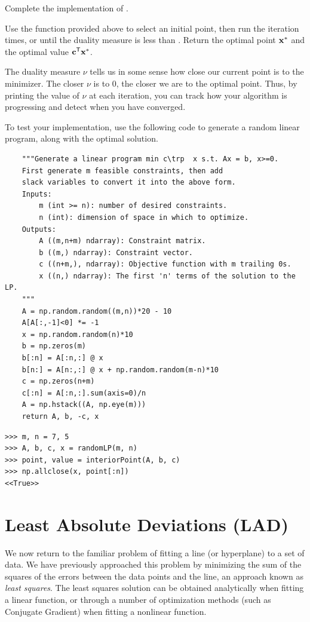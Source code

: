 \begin{problem} %
Complete the implementation of .

Use the function  provided above to select an initial point, then run the iteration  times, or until the duality measure is less than .
Return the optimal point $\mathbf{x}^*$ and the optimal value $\mathbf{c}^{\mathsf T} \mathbf{x}^*$.

The duality measure $\nu$ tells us in some sense how close our current point is to the minimizer.
The closer $\nu$ is to 0, the closer we are to the optimal point.
Thus, by printing the value of $\nu$ at each iteration, you can track how your algorithm is progressing and detect when you have converged.

To test your implementation, use the following code to generate a random linear program, along with the optimal solution.
\begin{lstlisting}
    """Generate a linear program min c\trp  x s.t. Ax = b, x>=0.
    First generate m feasible constraints, then add
    slack variables to convert it into the above form.
    Inputs:
        m (int >= n): number of desired constraints.
        n (int): dimension of space in which to optimize.
    Outputs:
        A ((m,n+m) ndarray): Constraint matrix.
        b ((m,) ndarray): Constraint vector.
        c ((n+m,), ndarray): Objective function with m trailing 0s.
        x ((n,) ndarray): The first 'n' terms of the solution to the LP.
    """
    A = np.random.random((m,n))*20 - 10
    A[A[:,-1]<0] *= -1
    x = np.random.random(n)*10
    b = np.zeros(m)
    b[:n] = A[:n,:] @ x
    b[n:] = A[n:,:] @ x + np.random.random(m-n)*10
    c = np.zeros(n+m)
    c[:n] = A[:n,:].sum(axis=0)/n
    A = np.hstack((A, np.eye(m)))
    return A, b, -c, x
\end{lstlisting}
\begin{lstlisting}
>>> m, n = 7, 5
>>> A, b, c, x = randomLP(m, n)
>>> point, value = interiorPoint(A, b, c)
>>> np.allclose(x, point[:n])
<<True>>
\end{lstlisting}
\end{problem}


\section*{Least Absolute Deviations (LAD)} %
We now return to the familiar problem of fitting a line (or hyperplane) to a set of data.
We have previously approached this problem by minimizing the sum of the squares of the errors between the data points and the line, an approach known as \emph{least squares}.
The least squares solution can be obtained analytically when fitting a linear function, or through a number of optimization methods (such as Conjugate Gradient) when fitting a nonlinear function.

